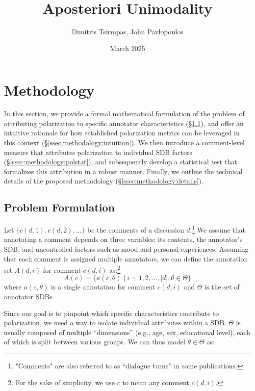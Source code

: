 \documentclass{article}
\title{Aposteriori Unimodality}
\author{Dimitris Tsirmpas, John Pavlopoulos}
\date{March 2025}
\begin{document}
\maketitle

\section{Methodology}

In this section, we provide a formal mathematical formulation of the problem of attributing polarization to specific annotator characteristics (\S\ref{ssec:methodology:problem}), and offer an intuitive rationale for how established polarization metrics can be leveraged in this context (\S\ref{ssec:methodology:intuition}). We then introduce a comment-level measure that attributes polarization to individual \ac{SDB} factors (\S\ref{ssec:methodology:polstat}), and subsequently develop a statistical test that formalizes this attribution in a robust manner. Finally, we outline the technical details of the proposed methodology (\S\ref{ssec:methodology:details}).

\subsection{Problem Formulation}
\label{ssec:methodology:problem}

Let $\{c(d,1), c(d,2), \ldots\}$ be the comments of a discussion $d$.\footnote{"Comments" are also referred to as “dialogue turns” in some publications.} We assume that annotating a comment depends on three variables: its contents, the annotator's \ac{SDB}, and uncontrolled factors such as mood and personal experiences. Assuming that each comment is assigned multiple annotators, we can define the annotation set $A(d, i)$ for comment $c(d, i)$ as:\footnote{For the sake of simplicity, we use $c$ to mean any comment $c(d, i)$.}
\begin{equation}
    A(c) = \{a(c, \theta) \mid i=1, 2, \ldots, \lvert d \rvert, \theta \in \Theta \}
\end{equation}
\noindent where  $a(c, \theta)$ is a single annotation for comment $c(d,i)$ and $\Theta$ is the set of annotator \acp{SDB}.

Since our goal is to pinpoint which specific characteristics contribute to polarization, we need a way to isolate individual attributes within a \ac{SDB}. $\Theta$ is usually composed of multiple ``dimensions'' (e.g., age, sex, educational level), each of which is split between various groups. We can thus model $\theta \in \Theta$ as:
\end{document}
